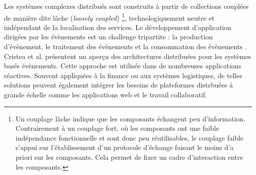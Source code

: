 Les systèmes complexes distribués sont construits à partir de collections 
couplées de manière dite \og lâche\fg{} (\textit{loosely coupled}) \footnote{Un 
	couplage lâche indique que les 
	composants échangent peu d'information. Contrairement à un couplage fort, où 
	les 
	composants ont une faible indépendance fonctionnelle et sont donc peu 
	réutilisables, le couplage faible s'appui sur l'établissement d'un protocole 
	d'échange faisant le moins d'a priori sur les composants. Cela permet de fixer 
	un 
	cadre d'interaction entre les composants.}, technologiquement neutre 
et indépendant de la localisation des services. 
Le développement d'application dirigées par les évènements est un challenge 
tripartite : la production d'évènement, le traitement des évènements et la 
consommation des évènements \cite{Chandy2011}.
Cristea et al. \cite{Cristea2011} présentent un aperçu des architectures distribuées 
pour les systèmes basés évènements. 
Cette approche est utilisée dans de nombreuses applications réactives. Souvent 
appliquées à la finance ou aux systèmes logistiques, de telles solutions peuvent 
également intégrer les besoins de plateformes distrbuées à grande échelle comme 
les applications web et le travail collaboratif.

